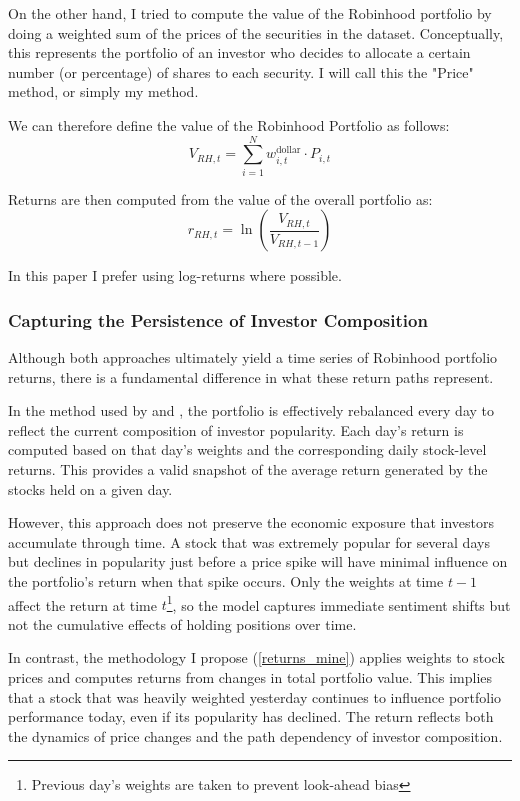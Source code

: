 On the other hand, I tried to compute the value of the Robinhood portfolio by doing a weighted sum of the prices of the securities in the dataset.
Conceptually, this represents the portfolio of an investor who decides to allocate a certain number (or percentage) of shares to each security.
I will call this the "Price" method, or simply my method.

We can therefore define the value of the Robinhood Portfolio as follows:
\begin{equation}
    V_{RH,t}=\sum_{i=1}^N w^{\text{dollar}}_{i,t}\cdot P_{i,t}
\end{equation}

Returns are then computed from the value of the overall portfolio as:
\begin{equation}
    r_{RH,t} = \ln\left(\frac{V_{RH,t}}{V_{RH,t-1}}\right)
\label{returns_mine}
\end{equation}

In this paper I prefer using log-returns where possible. 

\subsubsection{Capturing the Persistence of Investor Composition}
Although both approaches ultimately yield a time series of Robinhood portfolio returns, there is a fundamental difference in what these return paths represent.

In the method used by \cite{Fedyk2024} and \cite{Welch2022}, the portfolio is effectively rebalanced every day to reflect the current composition of investor popularity.
Each day's return is computed based on that day's weights and the corresponding daily stock-level returns.
This provides a valid snapshot of the average return generated by the stocks held on a given day.

However, this approach does not preserve the economic exposure that investors accumulate through time.
A stock that was extremely popular for several days but declines in popularity just before a price spike will have minimal influence on the portfolio's return when that spike occurs.
Only the weights at time $t-1$ affect the return at time $t$\footnote{Previous day's weights are taken to prevent look-ahead bias}, so the model captures immediate sentiment shifts but not the cumulative effects of holding positions over time.

In contrast, the methodology I propose (\ref{returns_mine}) applies weights to stock prices and computes returns from changes in total portfolio value.
This implies that a stock that was heavily weighted yesterday continues to influence portfolio performance today, even if its popularity has declined.
The return reflects both the dynamics of price changes and the path dependency of investor composition.

